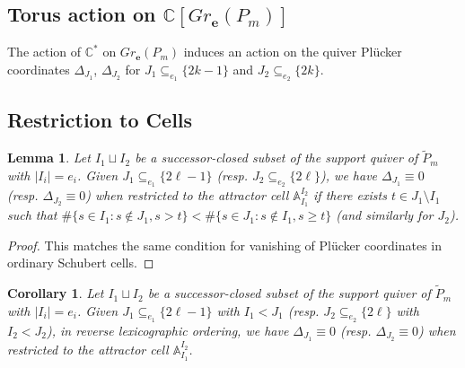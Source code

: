 \documentclass{amsart}
\newtheorem{corollary}[theorem]{Corollary}
\newtheorem{lemma}[theorem]{Lemma}
\numberwithin{equation}{section}
\renewcommand{\AA}{\mathbb{A}}
\newcommand{\CC}{\mathbb{C}}
\newcommand{\bfe}{\mathbf{e}}
\begin{document}
  \subsection{Torus action on $\CC[Gr_\bfe(P_m)]$}
  The action of $\CC^*$ on $Gr_\bfe(P_m)$ induces an action on the quiver Pl\"ucker coordinates $\Delta_{J_1}$, $\Delta_{J_2}$ for $J_1\subseteq_{e_1} \{2k-1\}$ and $J_2\subseteq_{e_2} \{2k\}$.


  \subsection{Restriction to Cells}

  \begin{lemma}
    Let $I_1\sqcup I_2$ be a successor-closed subset of the support quiver of $\tilde P_m$ with $|I_i|=e_i$.
    Given $J_1\subseteq_{e_1} \{2\ell-1\}$ (resp. $J_2\subseteq_{e_2} \{2\ell\}$), we have $\Delta_{J_1}\equiv 0$ (resp. $\Delta_{J_2}\equiv 0$) when restricted to the attractor cell $\AA_{I_1}^{I_2}$ if there exists $t\in J_1\setminus I_1$ such that $\#\{s\in I_1:s\notin J_1, s>t\} < \#\{s\in J_1:s\notin I_1, s \ge t\}$ (and similarly for $J_2$).
  \end{lemma}
  \begin{proof}
    This matches the same condition for vanishing of Pl\"ucker coordinates in ordinary Schubert cells.
  \end{proof}
  \begin{corollary}
    Let $I_1\sqcup I_2$ be a successor-closed subset of the support quiver of $\tilde P_m$ with $|I_i|=e_i$.
    Given $J_1 \subseteq_{e_1} \{2\ell-1\}$ with $I_1<J_1$ (resp. $J_2 \subseteq_{e_2} \{2\ell\}$ with $I_2<J_2$), in reverse lexicographic ordering, we have $\Delta_{J_1} \equiv 0$ (resp. $\Delta_{J_2}\equiv 0$) when restricted to the attractor cell $\AA_{I_1}^{I_2}$.
  \end{corollary}
\end{document}
